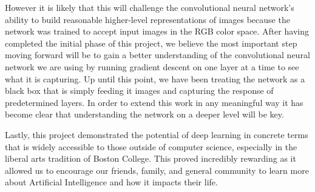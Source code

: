 \documentclass[11pt,letterpaper,journal]{IEEEtran}
\begin{document}
However it is likely that this will
challenge the convolutional neural network's ability to build reasonable
higher-level representations of images because the network was trained to
accept input images in the RGB color space.  After having completed the initial
phase of this project, we believe the most important step moving forward will be
to gain a better understanding of the convolutional neural network we are using
by running gradient descent on one layer at a time to see what it is capturing.
Up until this point, we have been treating the network as a black box that is
simply feeding it images and capturing the response of predetermined layers. In
order to extend this work in any meaningful way it has become clear that
understanding the network on a deeper level will be key.

Lastly, this project demonstrated the potential of deep learning in concrete
terms that is widely accessible to those outside of computer science,
especially in the liberal arts tradition of Boston College. This proved
incredibly rewarding as it allowed us to encourage our friends, family, and
general community to learn more about Artificial Intelligence and how it
impacts their life.


\end{document}

